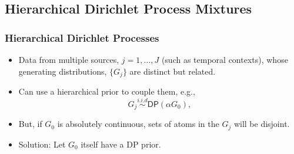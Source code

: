 \documentclass[11pt, mathserif, handout, table]{beamer}
\begin{document}
\subsection{Hierarchical Dirichlet Process Mixtures}
\label{sec:dirichl-proc-mixt}
\begin{frame}
  \frametitle{Hierarchical Dirichlet Processes}
  \begin{itemize}[<+->]
  \item Data from multiple sources, $j = 1, \dots, J$ (such
    as temporal contexts),
    whose generating distributions, $\{G_j\}$ are distinct but
    related.
\item Can use a hierarchical prior to couple them, e.g.,
    \begin{equation}
      \label{eq:11}
      G_j \stackrel{i.i.d}{\sim} \mathsf{DP}(\alpha G_0),
    \end{equation}
  \item But, if $G_0$ is absolutely continuous, sets of atoms in the
    $G_j$ will be disjoint.
  \item Solution: Let $G_0$ itself have a DP prior.
  \end{itemize}
\end{frame}
\end{document}
